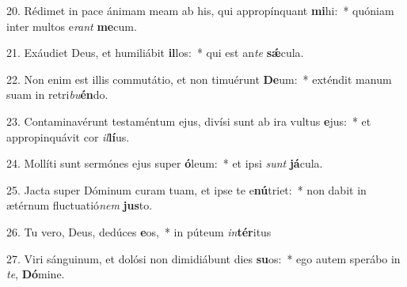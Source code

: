 20. Rédimet in pace ánimam meam ab his, qui appropínquant \textbf{mi}hi:~*  quóniam inter multos e\textit{rant} \textbf{me}cum.\

21. Exáudiet Deus, et humiliábit \textbf{il}los:~*  qui est an\textit{te} \textbf{sǽ}cula.\

22. Non enim est illis commutátio, et non timuérunt \textbf{De}um:~*  exténdit manum suam in retri\textit{bu}\textbf{én}do.\

23. Contaminavérunt testaméntum ejus, divísi sunt ab ira vultus \textbf{e}jus:~*  et appropinquávit cor \textit{il}\textbf{lí}us.\

24. Mollíti sunt sermónes ejus super \textbf{ó}leum:~*  et ipsi \textit{sunt} \textbf{já}cula.\

25. Jacta super Dóminum curam tuam, et ipse te e\textbf{nú}triet:~*  non dabit in ætérnum fluctuatió\textit{nem} \textbf{jus}to.\

26. Tu vero, Deus, dedúces \textbf{e}os,~*  in púteum \textit{in}\textbf{tér}itus\

27. Viri sánguinum, et dolósi non dimidiábunt dies \textbf{su}os:~*  ego autem sperábo in \textit{te}, \textbf{Dó}mine.\

